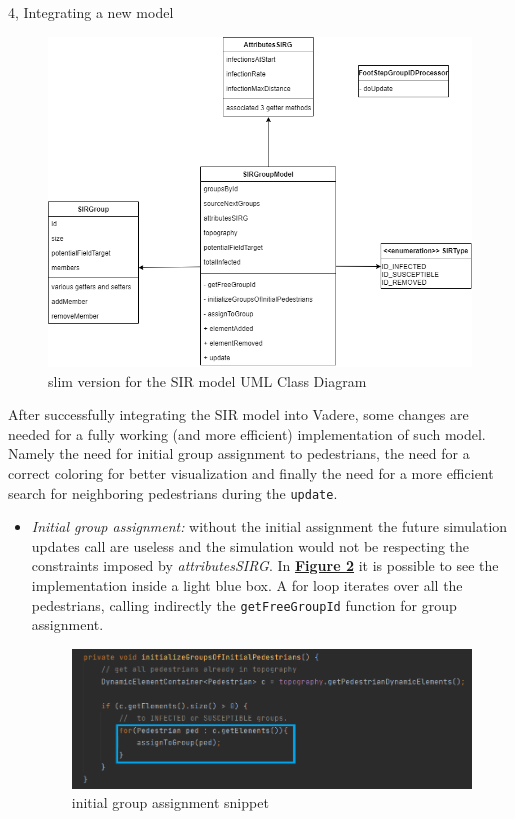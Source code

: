 \documentclass[10pt,a4paper]{article}
\begin{document}
\begin{task}{4, Integrating a new model}
\begin{figure}[H]
    \centering
    \includegraphics[scale=0.5]{images/SIRClassDiagram.drawio.png}
    \caption{slim version for the SIR model UML Class Diagram}
    \label{fig:class-diagram}
\end{figure}

After successfully integrating the SIR model into Vadere, some changes are needed for a fully working (and more efficient) implementation of such model. Namely the need for initial group assignment to pedestrians, the need for a correct coloring for better visualization and finally the need for a more efficient search for neighboring pedestrians during the \texttt{update}.
\begin{itemize}
    \item \textit{Initial group assignment:} without the initial assignment the future simulation updates call are useless and the simulation would not be respecting the constraints imposed by \textit{attributesSIRG}. In \textbf{\hyperref[fig:init-snippet]{Figure \ref{fig:init-snippet}}} it is possible to see the implementation inside a light blue box. A for loop iterates over all the pedestrians, calling indirectly the \texttt{getFreeGroupId} function for group assignment.
    \begin{figure}[H]
    \centering
    \includegraphics[scale=0.7]{images/simulation_initiation_snippet.png}
    \caption{initial group assignment snippet}
    \label{fig:init-snippet}
\end{figure}


\end{itemize}
\end{task}
\end{document}
